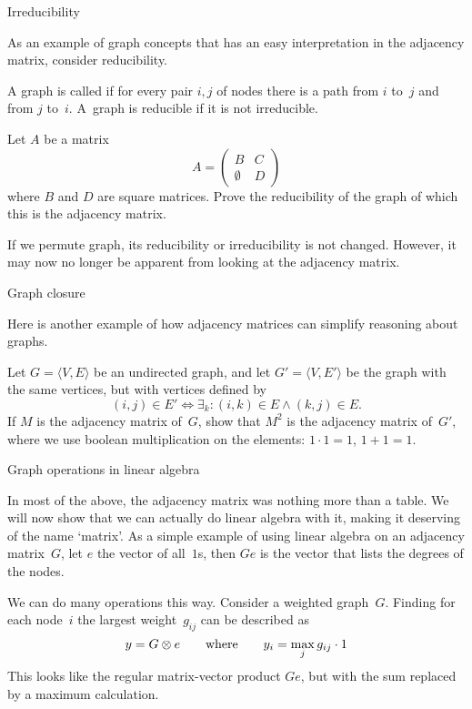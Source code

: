  {Irreducibility}

As an example of graph concepts that has an easy interpretation in the
adjacency matrix, consider reducibility.

\begin{definition}
A graph is called  if for every pair $i,j$ of
nodes there is a path from $i$ to~$j$ and from $j$ to~$i$. A~graph is
reducible if it is not irreducible.
\end{definition}

\begin{exercise}
  Let $A$ be a matrix
  \[ A=
  \begin{pmatrix}
    B&C\\ \emptyset&D
  \end{pmatrix}
  \]
  where $B$ and $D$ are square matrices. Prove the reducibility of the
  graph of which this is the adjacency matrix.
\end{exercise}

If we permute graph, its reducibility or irreducibility is not
changed. However, it may now no longer be apparent from looking 
at the adjacency matrix.

 {Graph closure}
\label{app:graph-closure}

Here is another example of how adjacency matrices can simplify
reasoning about graphs.
\begin{exercise}
  Let $G=\langle V,E\rangle$ be an undirected graph, and let $G'=\langle
  V,E'\rangle$ be the graph with the same vertices, but with vertices
  defined by
  \[ (i,j)\in E'\Leftrightarrow \exists_k\colon (i,k)\in E\wedge
  (k,j)\in E. \]
  If $M$ is the adjacency matrix of~$G$, show that $M^2$ is the
  adjacency matrix of~$G'$, where we use boolean multiplication on the
  elements: $1\cdot1=1$, $1+1=1$.
\end{exercise}

 {Graph operations in linear algebra}
\label{app:graph-mult}

In most of the above, the adjacency matrix was nothing more than a table.
We will now show that we can actually do linear algebra with it,
making it deserving of the name `matrix'. As a simple example
of using linear algebra on an adjacency matrix~$G$,
let $e$ the vector of all~$1$s, then $Ge$ is 
the vector that lists the degrees of the nodes.

We can do many operations this way. Consider a weighted graph~$G$.
Finding for each node~$i$ the largest weight~$g_{ij}$ can be described as
\[ y=G\otimes e\qquad\hbox{where}\qquad
   y_i=\max_j g_{ij}\cdot 1
\]
This looks like the regular matrix-vector product $Ge$, but with
the sum replaced by a maximum calculation.

